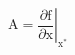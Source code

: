 \documentclass{CCI2020}
\begin{document}
\begin{equation}
	\boldsymbol{\mathrm{A}} = \left.\dfrac{\partial \boldsymbol{\mathrm{f}}}{\partial \boldsymbol{\mathrm{x}}}\right\vert_{\boldsymbol{\mathrm{x}^*}}
\end{equation}
\end{document}
